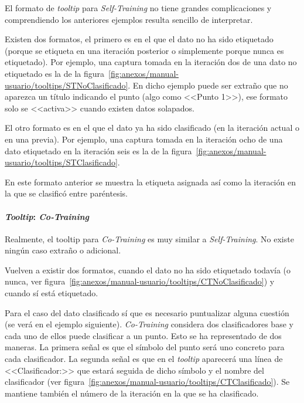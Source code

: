 El formato de \textit{tooltip} para \textit{Self-Training} no tiene grandes
complicaciones y comprendiendo los anteriores ejemplos resulta sencillo de
interpretar.

Existen dos formatos, el primero es en el que el dato no ha sido etiquetado
(porque se etiqueta en una iteración posterior o simplemente porque nunca es
etiquetado). Por ejemplo, una captura tomada en la iteración dos de una dato no
etiquetado es la de la
figura~\ref{fig:anexos/manual-usuario/tooltips/STNoClasificado}. En dicho
ejemplo puede ser extraño que no aparezca un título indicando el punto (algo
como <<Punto 1>>), ese formato solo se <<activa>> cuando existen datos
solapados.


El otro formato es en el que el dato ya ha sido clasificado (en la iteración
actual o en una previa). Por ejemplo, una captura tomada en la iteración ocho de
una dato etiquetado en la iteración seis es la de la
figura~\ref{fig:anexos/manual-usuario/tooltips/STClasificado}.


En este formato anterior se muestra la etiqueta asignada así como la iteración
en la que se clasificó entre paréntesis.

\paragraph{\textit{Tooltip}: \textit{Co-Training}}

Realmente, el tooltip para \textit{Co-Training} es muy similar a
\textit{Self-Training}. No existe ningún caso extraño o adicional.

Vuelven a existir dos formatos, cuando el dato no ha sido etiquetado todavía (o
nunca, ver figura~\ref{fig:anexos/manual-usuario/tooltips/CTNoClasificado}) y
cuando sí está etiquetado. 


Para el caso del dato clasificado sí que es necesario puntualizar alguna
cuestión (se verá en el ejemplo siguiente). \textit{Co-Training} considera dos
clasificadores base y cada uno de ellos puede clasificar a un punto. Esto se ha
representado de dos maneras. La primera señal es que el símbolo del punto será
uno concreto para cada clasificador. La segunda señal es que en el
\textit{tooltip} aparecerá una línea de <<Clasificador:>> que estará seguida de
dicho símbolo y el nombre del clasificador (ver
figura~\ref{fig:anexos/manual-usuario/tooltips/CTClasificado}). Se mantiene
también el número de la iteración en la que se ha clasificado.


